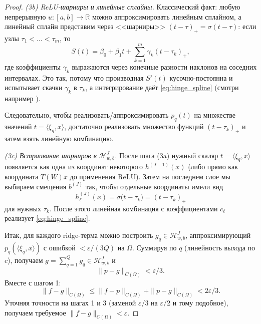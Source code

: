 \documentclass[../NDCNNAI_main.tex]{subfiles}
\begin{document}
\begin{proof}
\emph{(3b) ReLU-шарниры и линейные сплайны.}
Классический факт: любую непрерывную $u\colon[a,b]\to\mathbb R$ можно аппроксимировать линейным сплайном,
а линейный сплайн представим через <<шарниры>> $(t-\tau)_+=\sigma(t-\tau)$:
если узлы $\tau_1<\dots<\tau_m$, то
\[
S(t)=\beta_0+\beta_1 t+\sum_{k=1}^{m} \gamma_k (t-\tau_k)_+,
\tag{$\star$}\label{eq:hinge_spline}
\]
где коэффициенты $\gamma_k$ выражаются через конечные разности наклонов на соседних интервалах.
Это так, потому что производная $S'(t)$ кусочно-постоянна и испытывает скачки $\gamma_k$ в $\tau_k$,
а интегрирование даёт \eqref{eq:hinge_spline} (смотри например \cite[Глава 5]{DeVore1993}).

Следовательно, чтобы реализовать/аппроксимировать $p_q(t)$ на множестве значений $t=\langle\xi_q,x\rangle$,
достаточно реализовать множество функций $(t-\tau_k)_+$ и затем взять линейную комбинацию.

\emph{(3c) Встраивание шарниров в $\mathcal H^J_{w,b}$.}
После шага (3a) нужный скаляр $t=\langle\xi_q,x\rangle$ появляется как одна из координат некоторого $h^{(J-1)}(x)$
(либо прямо как координата $T(W)x$ до применения ReLU).
Затем на последнем слое мы выбираем смещения $b^{(J)}$ так, чтобы отдельные координаты имели вид
\[
h^{(J)}_{\ell}(x)=\sigma\big(t-\tau_k\big)=(t-\tau_k)_+
\]
для нужных $\tau_k$.
После этого линейная комбинация с коэффициентами $c_\ell$ реализует \eqref{eq:hinge_spline}.

Итак, для каждого ridge-терма можно построить $g_q\in \mathcal H^J_{w,b}$, аппроксимирующий
$p_q(\langle\xi_q,x\rangle)$ с ошибкой $<\varepsilon/(3Q)$ на $\Omega$.
Суммируя по $q$ (линейность выхода по $c$), получаем $g=\sum_{q=1}^{Q} g_q\in \mathcal H^J_{w,b}$ и
\[
\|p-g\|_{C(\Omega)}<\varepsilon/3.
\]
Вместе с шагом 1:
\[
\|f-g\|_{C(\Omega)}\le \|f-p\|_{C(\Omega)}+\|p-g\|_{C(\Omega)}<2\varepsilon/3.
\]
Уточняя точности на шагах 1 и 3 (заменой $\varepsilon/3$ на $\varepsilon/2$ и тому подобное), получаем требуемое $\|f-g\|_{C(\Omega)}<\varepsilon$.
\end{proof}
\end{document}
